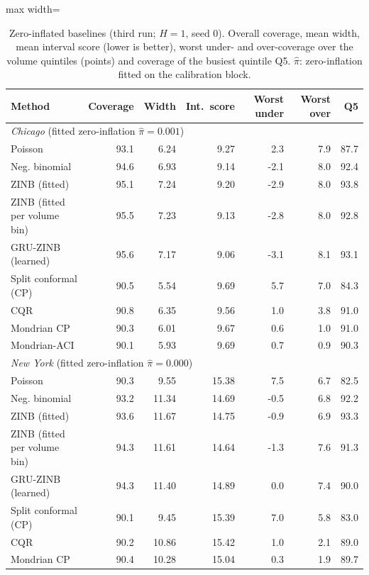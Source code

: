 \begin{table}[!htbp]\centering\scriptsize\setlength{\tabcolsep}{3.5pt}
\caption{Zero-inflated baselines (third run; $H=1$, seed 0). Overall coverage, mean width, mean interval score (lower is better), worst under- and over-coverage over the volume quintiles (points) and coverage of the busiest quintile Q5. $\hat\pi$: zero-inflation fitted on the calibration block.}\label{tab:zinb}
\begin{adjustbox}{max width=\linewidth}\begin{tabular}{lrrrrrr}\toprule
Method & Coverage & Width & Int.\ score & Worst under & Worst over & Q5\\\midrule
\multicolumn{7}{l}{\textit{Chicago} (fitted zero-inflation $\hat\pi=0.001$)}\\
Poisson & 93.1 & 6.24 & 9.27 & 2.3 & 7.9 & 87.7 \\
Neg. binomial & 94.6 & 6.93 & 9.14 & -2.1 & 8.0 & 92.4 \\
ZINB (fitted) & 95.1 & 7.24 & 9.20 & -2.9 & 8.0 & 93.8 \\
ZINB (fitted per volume bin) & 95.5 & 7.23 & 9.13 & -2.8 & 8.0 & 92.8 \\
GRU-ZINB (learned) & 95.6 & 7.17 & 9.06 & -3.1 & 8.1 & 93.1 \\
Split conformal (CP) & 90.5 & 5.54 & 9.69 & 5.7 & 7.0 & 84.3 \\
CQR & 90.8 & 6.35 & 9.56 & 1.0 & 3.8 & 91.0 \\
Mondrian CP & 90.3 & 6.01 & 9.67 & 0.6 & 1.0 & 91.0 \\
Mondrian-ACI & 90.1 & 5.93 & 9.69 & 0.7 & 0.9 & 90.3 \\
\midrule
\multicolumn{7}{l}{\textit{New York} (fitted zero-inflation $\hat\pi=0.000$)}\\
Poisson & 90.3 & 9.55 & 15.38 & 7.5 & 6.7 & 82.5 \\
Neg. binomial & 93.2 & 11.34 & 14.69 & -0.5 & 6.8 & 92.2 \\
ZINB (fitted) & 93.6 & 11.67 & 14.75 & -0.9 & 6.9 & 93.3 \\
ZINB (fitted per volume bin) & 94.3 & 11.61 & 14.64 & -1.3 & 7.6 & 91.3 \\
GRU-ZINB (learned) & 94.3 & 11.40 & 14.89 & 0.0 & 7.4 & 90.0 \\
Split conformal (CP) & 90.1 & 9.45 & 15.39 & 7.0 & 5.8 & 83.0 \\
CQR & 90.2 & 10.86 & 15.42 & 1.0 & 2.1 & 89.0 \\
Mondrian CP & 90.4 & 10.28 & 15.04 & 0.3 & 1.9 & 89.7 \\

\end{tabular}
\end{adjustbox}
\end{table}

